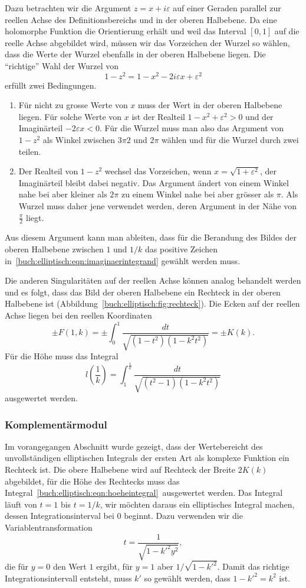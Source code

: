 Dazu betrachten wir die Argument $z=x+i\varepsilon$ auf einer Geraden
parallel zur reellen Achse des Definitionsbereichs und in der oberen
Halbebene.
Da eine holomorphe Funktion die Orientierung erhält und weil das
Interval $[0,1]$ auf die reelle Achse abgebildet wird, müssen wir das
Vorzeichen der Wurzel so wählen, dass die Werte der Wurzel ebenfalls
in der oberen Halbebene liegen.
Die ``richtige'' Wahl der Wurzel von 
\[
1-z^2 = 1-x^2-2i\varepsilon x + \varepsilon^2
\]
erfüllt zwei Bedingungen.
\begin{enumerate}
\item
Für nicht zu grosse Werte von $x$ muss der Wert in der oberen
Halbebene liegen.
Für solche Werte von $x$ ist der Realteil $1-x^2+\varepsilon^2>0$ und
der Imaginärteil $-2\varepsilon x<0$.
Für die Wurzel muss man also das Argument von $1-z^2$ als Winkel zwischen
$3\pi2$ und $2\pi$ wählen und für die Wurzel durch zwei teilen.
\item
Der Realteil von $1-z^2$ wechsel das Vorzeichen, wenn
$x=\sqrt{1+\varepsilon^2}$, der Imaginärteil bleibt dabei negativ.
Das Argument ändert von einem Winkel nahe bei aber kleiner als $2\pi$
zu einem Winkel nahe bei aber grösser als $\pi$.
Als Wurzel muss daher jene verwendet werden, deren Argument in der
Nähe von $\frac{\pi}2$ liegt.
\end{enumerate}
Aus diesem Argument kann man ableiten, dass für die Berandung des
Bildes der oberen Halbebene zwischen $1$ und $1/k$ das positive
Zeichen in~\eqref{buch:elliptisch:eqn:imaginaerintegrand}
gewählt werden muss.

Die anderen Singularitäten auf der reellen Achse können analog
behandelt werden und es folgt, dass das Bild der oberen Halbebene
ein Rechteck in der oberen Halbebene ist
(Abbildung~\ref{buch:elliptisch:fig:rechteck}).
Die Ecken auf der reellen Achse liegen bei den reellen Koordinaten
\[
\pm F(1,k)
=
\pm\int_0^1\frac{dt}{\sqrt{(1-t^2)(1-k^2t^2)}}
=
\pm K(k).
\]
Für die Höhe muss das Integral
\begin{equation}
l({\textstyle\frac{1}{k}})=\int_1^{\frac1{k}}
\frac{dt}{\sqrt{(t^2-1)(1-k^2t^2)}}
\label{buch:elliptisch:eqn:hoeheintegral}
\end{equation}
ausgewertet werden.

\subsubsection{Komplementärmodul}
Im vorangegangen Abschnitt wurde gezeigt, dass der Wertebereicht des
unvollständigen elliptischen Integrals der ersten Art als komplexe
Funktion ein Rechteck ist.
Die obere Halbebene wird auf Rechteck der Breite $2K(k)$ abgebildet,
für die Höhe des Rechtecks muss das
Integral~\eqref{buch:elliptisch:eqn:hoeheintegral} ausgewertet werden.
Das Integral läuft von $t=1$ bis $t=1/k$, wir möchten daraus ein
elliptisches Integral machen, dessen Integrationsinterval bei $0$
beginnt.
Dazu verwenden wir die Variablentransformation
\[
t = \frac{1}{\sqrt{1-k'^2y^2}},
\]
die für $y=0$ den Wert $1$ ergibt, für $y=1$ aber $1/\sqrt{1-k'^2}$.
Damit das richtige Integrationsintervall entsteht, muss $k'$ so gewählt
werden, dass $1-k'^2=k^2$ ist.

